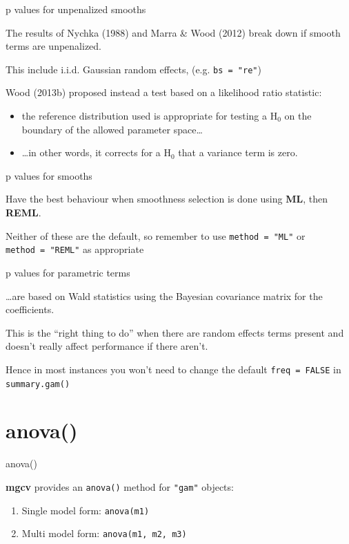 \documentclass[10pt,ignorenonframetext,compress, aspectratio=169]{beamer}
\providecommand{\tightlist}{%
  \setlength{\itemsep}{0pt}\setlength{\parskip}{0pt}}
\begin{document}
\begin{frame}[fragile]{p values for unpenalized smooths}

The results of Nychka (1988) and Marra \& Wood (2012) break down if
smooth terms are unpenalized.

This include i.i.d. Gaussian random effects, (e.g. \texttt{bs\ =\ "re"})

Wood (2013b) proposed instead a test based on a likelihood ratio
statistic:

\begin{itemize}
\tightlist
\item
  the reference distribution used is appropriate for testing a
  \(\mathrm{H}_0\) on the boundary of the allowed parameter
  space\ldots{}
\item
  \ldots{}in other words, it corrects for a \(\mathrm{H}_0\) that a
  variance term is zero.
\end{itemize}

\end{frame}

\begin{frame}[fragile]{p values for smooths}

Have the best behaviour when smoothness selection is done using
\textbf{ML}, then \textbf{REML}.

Neither of these are the default, so remember to use
\texttt{method\ =\ "ML"} or \texttt{method\ =\ "REML"} as appropriate

\end{frame}

\begin{frame}[fragile]{p values for parametric terms}

\ldots{}are based on Wald statistics using the Bayesian covariance
matrix for the coefficients.

This is the ``right thing to do'' when there are random effects terms
present and doesn't really affect performance if there aren't.

Hence in most instances you won't need to change the default
\texttt{freq\ =\ FALSE} in \texttt{summary.gam()}

\end{frame}

\section{anova()}\label{anova}

\begin{frame}[fragile]{anova()}

\textbf{mgcv} provides an \texttt{anova()} method for \texttt{"gam"}
objects:

\begin{enumerate}
\def\labelenumi{\arabic{enumi}.}
\tightlist
\item
  Single model form: \texttt{anova(m1)}
\item
  Multi model form: \texttt{anova(m1,\ m2,\ m3)}
\end{enumerate}

\end{frame}
\end{document}
